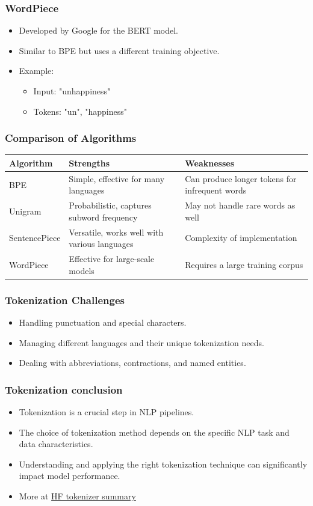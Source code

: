 \documentclass{beamer}
\begin{document}
\begin{frame}
\frametitle{WordPiece}
\begin{itemize}
    \item Developed by Google for the BERT model.
    \item Similar to BPE but uses a different training objective.
    \item Example:
    \begin{itemize}
        \item Input: "unhappiness"
        \item Tokens: "un", "happiness"
    \end{itemize}
\end{itemize}
\end{frame}

\begin{frame}
\frametitle{Comparison of Algorithms}
\scriptsize
\begin{tabular}{|l|p{3.5cm}|p{3.5cm}|}
\hline
Algorithm & Strengths & Weaknesses \\
\hline
BPE & Simple, effective for many languages & Can produce longer tokens for infrequent words \\
\hline
Unigram & Probabilistic, captures subword frequency & May not handle rare words as well \\
\hline
SentencePiece & Versatile, works well with various languages & Complexity of implementation \\
\hline
WordPiece & Effective for large-scale models & Requires a large training corpus \\
\hline
\end{tabular}
\end{frame}

\begin{frame}
    \frametitle{Tokenization Challenges}
    \begin{itemize}
        \item Handling punctuation and special characters.
        \item Managing different languages and their unique tokenization needs.
        \item Dealing with abbreviations, contractions, and named entities.
    \end{itemize}
\end{frame}

\begin{frame}
    \frametitle{Tokenization conclusion}
    \begin{itemize}
        \item Tokenization is a crucial step in NLP pipelines.
        \item The choice of tokenization method depends on the specific NLP task and data characteristics.
        \item Understanding and applying the right tokenization technique can significantly impact model performance.
        \item More at \href{https://huggingface.co/docs/transformers/tokenizer_summary}{HF tokenizer summary}
    \end{itemize}
\end{frame}
\end{document}
